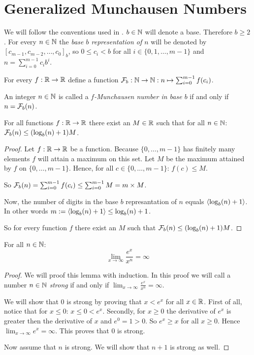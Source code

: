 \section*{Generalized Munchausen Numbers}

We will follow the conventions used in \cite{dvb}. $b\in\mathbb{N}$ will denote a base.
Therefore $b \ge 2$. For every $n \in \mathbb{N}$ the \emph{base $b$ representation
of $n$} will be denoted by $[c_{m-1}, c_{m-2}, \ldots, c_{0}]_{b}$, so 
$0 \le c_{i} < b$ for all $i \in \{0,1,\ldots,m-1\}$ and 
$n = \sum_{i=0}^{m-1} c_{i}b^{i}$.

For every $f : \mathbb{R} \rightarrow \mathbb{R}$ define a function $\mathcal{F}_{b} : \mathbb{N} \rightarrow
\mathbb{N} : n \mapsto \sum_{i=0}^{m-1} f(c_{i})$.

\begin{definition}
	An integer $n \in \mathbb{N}$ is called a \emph{$f$-Munchausen number in base $b$}
	if and only if $n = \mathcal{F}_{b}(n)$.
\end{definition}


\begin{lemma}
	For all functions $f : \mathbb{R} \rightarrow \mathbb{R}$ there exist an 
	$M \in \mathbb{R}$ such that for all $n \in \mathbb{N}$: $\mathcal{F}_{b}(n) \le (\log_{b}(n) + 1) M$.
\end{lemma}

\begin{proof}
	Let $f : \mathbb{R} \rightarrow \mathbb{R}$ be a function. Because $\{0,\ldots,m-1\}$ has 
	finitely many elements $f$ will attain a maximum on this set. Let $M$ be the
	maximum	attained by $f$ on $\{0,\ldots,m-1\}$. Hence, for all 
	$c \in \{0,\ldots,m-1\}$: $f(c) \le M$.
	
	So $\mathcal{F}_{b}(n) = \sum_{i=0}^{m-1} f(c_{i}) \le 
	\sum_{i=0}^{m-1} M = m \times M$.
	
	Now, the number of digits in the base $b$ represantation of $n$ equals 
	$\langle\log_{b}(n) + 1\rangle$. In other words $m := \langle\log_{b}(n) + 1\rangle 
	\le \log_{b}(n) + 1$.
	
	So for every function $f$ there exist an $M$ such that 
	$\mathcal{F}_{b}(n) \le (\log_{b}(n) + 1) M$.
\end{proof}

\begin{lemma}
	For all $n \in \mathbb{N}$: 
	\[
		\lim_{x \rightarrow \infty} \frac{e^{x}}{x^{n}} = \infty
	\]
\end{lemma}

\begin{proof}
	We will proof this lemma with induction. In this proof we will call a number
	$n \in \mathbb{N}$ \emph{strong} if and only if
	$\lim_{x \rightarrow \infty} \frac{e^{x}}{x^{n}} = \infty$.
	
	We will show that $0$ is strong by proving that $x \lt e^{x}$ for all 
	$x \in \mathbb{R}$. First of all, notice that for $x \le 0$: $x \le 0 \lt e^{x}$.
	Secondly, for $x \ge 0$	the derivative of $e^{x}$ is greater then the 
	derivative of $x$ and $e^{0} = 1 \gt 0$. So $e^{x} \ge x$ for all $x \ge 0$.
	Hence $\lim_{x \rightarrow \infty} e^{x} = \infty$. This proves that $0$
	is strong.
	
	Now assume that $n$ is strong. We will show that $n+1$ is strong as well.
\end{proof}
